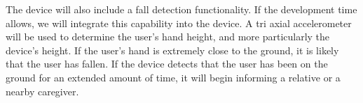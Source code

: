         The device will also include a fall detection functionality. If the development time allows, we will integrate
        this capability into the device. A tri axial accelerometer will be used to determine the user's hand height, and
        more particularly the device's height. If the user's hand is extremely close to the ground, it is likely that
        the user has fallen. If the device detects that the user has been on the ground for an extended amount of time,
        it will begin informing a relative or a nearby caregiver.
